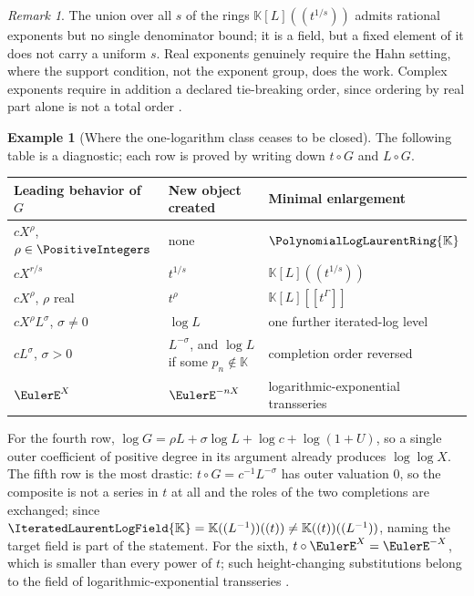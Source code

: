 \documentclass[11pt,oneside]{article}
\theoremstyle{plain}
\theoremstyle{definition}
\newtheorem{example}[theorem]{Example}
\theoremstyle{remark}
\newtheorem{remark}[theorem]{Remark}
\newcommand{\K}{\mathbb{K}}
\newcommand{\PLlau}{\PolynomialLogLaurentRing{\K}}       %
\newcommand{\PLit}{\IteratedLaurentLogField{\K}}         %
\newcommand{\compose}{\mathbin{\circ}}
\begin{document}
\begin{remark}
The union over all \(s\) of the rings \(\K[L]((t^{1/s}))\) admits rational
exponents but no single denominator bound; it is a field, but a fixed element
of it does not carry a uniform \(s\).  Real exponents genuinely require the
Hahn setting, where the support condition, not the exponent group, does the
work.  Complex exponents require in addition a declared tie-breaking order,
since ordering by real part alone is not a total order
\cite{hahn,vanderhoeven-book}.
\end{remark}

\begin{example}[Where the one-logarithm class ceases to be closed]
\label{plt:ex:cmp-closure-failures}
The following table is a diagnostic; each row is proved by writing down
\(t\compose G\) and \(L\compose G\).
\begin{center}
\begin{tabular}{@{}lll@{}}
\hline
Leading behavior of \(G\) & New object created & Minimal enlargement\\
\hline
\(cX^{\rho}\), \(\rho\in\PositiveIntegers\)
 & none & \(\PLlau\)\\
\(cX^{r/s}\)
 & \(t^{1/s}\) & \(\K[L]((t^{1/s}))\)\\
\(cX^{\rho}\), \(\rho\) real
 & \(t^{\rho}\) & \(\K[L][[t^{\Gamma}]]\)\\
\(cX^{\rho}L^{\sigma}\), \(\sigma\ne0\)
 & \(\log L\) & one further iterated-log level\\
\(cL^{\sigma}\), \(\sigma>0\)
 & \(L^{-\sigma}\), and \(\log L\) if some \(p_n\notin\K\)
 & completion order reversed\\
\(\EulerE^{X}\)
 & \(\EulerE^{-nX}\) & logarithmic-exponential transseries\\
\hline
\end{tabular}
\end{center}
For the fourth row, \(\log G=\rho L+\sigma\log L+\log c+\log(1+U)\), so a
single outer coefficient of positive degree in its argument already produces
\(\log\log X\).  The fifth row is the most drastic: \(t\compose G=c^{-1}L^{-\sigma}\)
has outer valuation \(0\), so the composite is not a series in \(t\) at all
and the roles of the two completions are exchanged; since
\(\PLit=\K((L^{-1}))((t))\ne\K((t))((L^{-1}))\), naming the target field is
part of the statement.  For the sixth,
\(t\compose\EulerE^{X}=\EulerE^{-X}\), which is smaller than every power of
\(t\); such height-changing substitutions belong to the field of
logarithmic-exponential transseries
\cite{edgar-beginners,vanderhoeven-book,adh-book}.
\end{example}
\end{document}
